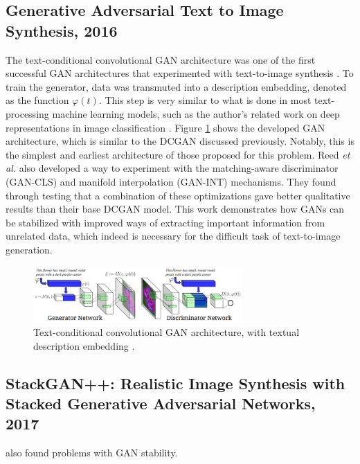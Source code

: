 \documentclass[letterpaper]{article} %
\begin{document}

\subsection{Generative Adversarial Text to Image Synthesis, 2016}
The text-conditional convolutional GAN architecture was one of the first 
successful GAN architectures that experimented with text-to-image synthesis 
\cite{gan_text_to_image}. To train the generator, data was transmuted into a 
description embedding, denoted as the function $\varphi(t)$. This step is 
very similar to what is done in most text-processing machine learning models, 
such as the author's related work on deep representations in image 
classification \cite{deep_visual_descriptions}. Figure \ref{fig:cond_gan} shows 
the developed GAN architecture, which is similar to 
the DCGAN discussed previously. Notably, this is the simplest and earliest 
architecture of those proposed for this problem. Reed \textit{et al.}
also developed a way to experiment with the matching-aware
discriminator (GAN-CLS) and manifold interpolation (GAN-INT) mechanisms. They 
found through testing that a combination of these optimizations gave better 
qualitative results than their base DCGAN model. This work demonstrates how 
GANs can be stabilized with improved ways of extracting important information 
from unrelated data, which indeed is necessary for the difficult task of 
text-to-image generation.

\begin{figure}[htbp]
\centerline{\includegraphics[width=8cm]{cond_gan.png}}
\caption{Text-conditional convolutional GAN architecture, with textual 
description embedding \cite{gan_text_to_image}.}
\label{fig:cond_gan}
\end{figure}

\subsection{StackGAN++: Realistic Image Synthesis
with Stacked Generative Adversarial Networks, 2017}
\cite{stackgan++} also found problems with GAN stability.
\end{document}
